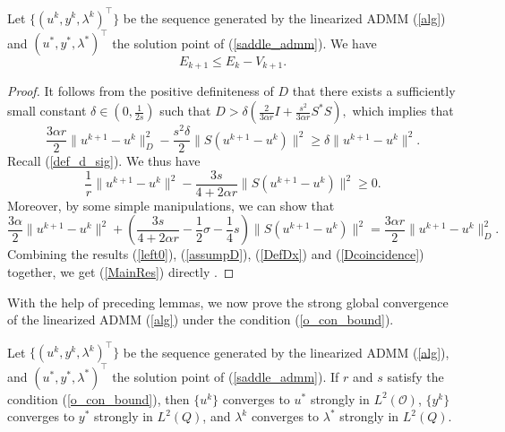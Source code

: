 \documentclass[final]{siamart171218}
\theoremstyle{remark}
\begin{document}
\begin{lemma}
Let $\{(u^k, y^k, \lambda^k)^\top\}$ be the sequence generated by the linearized ADMM (\ref{alg}) and $(u^*, y^*, \lambda^*)^\top$ the solution point of (\ref{saddle_admm}). We have
	\begin{equation}\label{MainRes}
	E_{k+1}\leq E_k-V_{k+1}.
	\end{equation}
\end{lemma}



\begin{proof}
It follows from the positive definiteness of $D$ that there exists a sufficiently small constant $\delta \in (0, \frac{1}{2s})$ such that
	$ D > \delta (\frac{2}{3\alpha r} I + \frac{s^2}{3 \alpha r}S^*S),$
	which implies that
	\begin{equation}
	\label{assumpD}
	\frac{3\alpha r}{2} \|u^{k+1} - u^k \|^2_D -\frac{s^2\delta}{2} \|S(u^{k+1}- u^k)\|^2 \geq \delta \|u^{k+1}- u^k\|^2.
	\end{equation}
		Recall (\ref{def_d_sig}). We thus have
	\begin{equation}
	\label{DefDx}
	\frac{1}{r} \|u^{k+1} - u^k\|^2 - \frac{3s}{4 + 2 \alpha r} \| S (u^{k+1} - u^k)\|^2 \geq 0.
	\end{equation}
	Moreover, by some simple manipulations, we can show that
	\begin{equation}
	\label{Dcoincidence}
	\frac{3\alpha }{2} \|u^{k+1} - u^k\|^2 + ( \frac{3s}{4 + 2 \alpha r} - \frac{1}{2} \sigma - \frac{1}{4} s) \|S(u^{k+1}- u^k)\|^2
	= \frac{3\alpha r}{2} \|u^{k+1} - u^k \|^2_D.
	\end{equation}
Combining the results (\ref{left0}), (\ref{assumpD}),  (\ref{DefDx}) and (\ref{Dcoincidence}) together, we get (\ref{MainRes}) directly .
\end{proof}

With the help of preceding lemmas, we now prove the strong global convergence of the linearized ADMM (\ref{alg}) under the condition (\ref{o_con_bound}).

\begin{theorem}
	Let $\{(u^k, y^k, \lambda^k)^\top\}$ be the sequence generated by the linearized ADMM (\ref{alg}), and $(u^*, y^*, \lambda^*)^\top$ the solution point of (\ref{saddle_admm}). If $r$ and $s$ satisfy the condition (\ref{o_con_bound}), then $\{u^k\}$ converges to $u^*$ strongly in $L^2(\mathcal{O})$, $\{y^k\}$ converges to $y^*$ strongly in $L^2(Q)$, and $\lambda^k$ converges to $\lambda^*$ strongly in $L^2(Q)$.
\end{theorem}
\end{document}
